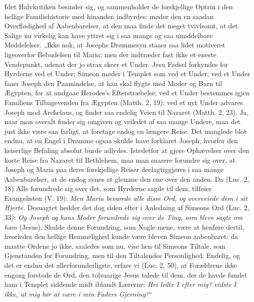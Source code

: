 \documentclass[12pt,a4paper]{book}
\begin{document}
Idet Halvkritiken besinder sig, og sammenholder de forskjellige Optrin i den hellige
Familiehistorie med hinanden indbyrdes: møder den en saadan Overflødighed af
Aabenbarelser, at den maa finde det meget tvivlsomt, at det Salige nu virkelig kan
have yttret sig i saa mange og saa umiddelbare Meddelelser. „Ikke nok, at Josephs
Drømmesyn staaer saa lidet motiveret ligeoverfor Bebudelsen til Maria; men der
indtræder fast ikke et eneste Vendepunkt, udenat der jo strax skeer et Under. Jesu
Fødsel forkyndes for Hyrderne ved et Under; Simeon møder i Templet som ved et Under;
ved et Under faaer Joseph den Paamindelse, at han skal flygte med Moder og Barn til
Ægypten, for at undgaae Herodes's Efterstræbelse; ved et Under bestemmes igjen
Familiens Tilbagevenden fra Ægypten (Matth. 2, 19); ved et nyt Under advares Joseph
mod Archelaus, og finder saa endelig Veien til Nazaret (Matth. 2, 23). Ja, naar man
overalt finder sig omgiven og veiledet af saa mange Undere, maa det just ikke være
saa farligt, at foretage endog en længere Reise. Det manglede blot endnu, at en Engel
i Drømme ogsaa skulde have forklaret Joseph, hvorfor den keiserlige Befaling absolut
burde adlydes. Istedetfor at gjøre Ophævelser over den korte Reise fra Nazaret til
Bethlehem, maa man snarere forundre sig over, at Joseph og Maria paa deres
forskjellige Reiser deelagtiggjøres i saa mange Aabenbarelser, at de endog synes at
glemme den ene over
den anden. Da (Luc. 2, 18) Alle forundrede sig over det, som Hyrderne sagde til dem,
tilføier Evangelisten (V. 19): \emph{Men Maria bevarede alle disse Ord, og overveiede
dem i sit Hjerte.} Desuagtet hedder det dog siden efter i Anledning af Simeons Ord
(Luc. 2, 33): \emph{Og Joseph og hans Moder forundrede sig over de Ting, som bleve
sagte om ham} (Jesus). Skulde denne Forundring, som Nogle mene, være at henføre
dertil, hvorledes den hellige Hemmelighed kunde være bleven Simeon aabenbaret: da
maatte Ordene jo ikke, saaledes som nu, vise hen til Simeons Tiltale, som Gjenstanden
for Forundring, men til den Tiltalendes Personlighed. Endelig, og det er endnu det
allerforunderligste, erfare vi (Luc. 2, 50), at Forældrene ikke engang forstode de
Ord, den tolvaarige Jesus talede til dem, der de havde fundet ham i Templet siddende
midt iblandt Lærerne: \emph{Hvi ledte I efter mig? vidste I ikke, at mig bør at være
i min Faders Gjerning?}“
\end{document}
